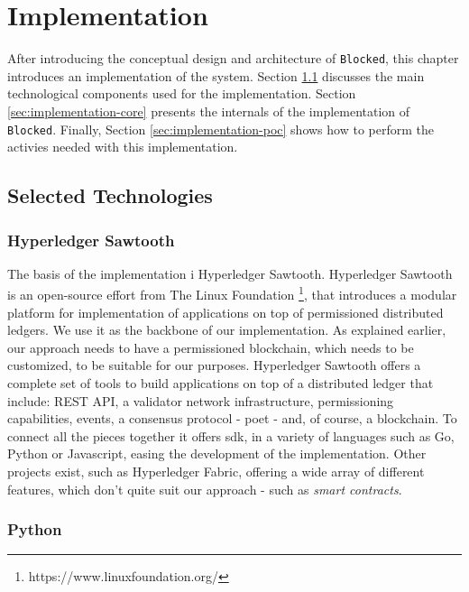 \chapter{Implementation}
\label{chap:implementation}

After introducing the conceptual design and architecture of \texttt{Blocked}, this chapter introduces an implementation of the system. Section \ref{sec:implementation-technology} discusses the main technological components used for the implementation. Section \ref{sec:implementation-core} presents the internals of the implementation of \texttt{Blocked}. Finally, Section \ref{sec:implementation-poc} shows how to perform the activies needed with this implementation.

\section{Selected Technologies}
\label{sec:implementation-technology}

\subsection{Hyperledger Sawtooth}

The basis of the implementation i Hyperledger Sawtooth. Hyperledger Sawtooth is an open-source effort from The Linux Foundation \footnote{https://www.linuxfoundation.org/}, that introduces a modular platform for implementation of applications on top of permissioned distributed ledgers. We use it as the backbone of our implementation. As explained earlier, our approach needs to have a permissioned blockchain, which needs to be customized, to be suitable for our purposes. Hyperledger Sawtooth offers a complete set of tools to build applications on top of a distributed ledger that include: REST API, a validator network infrastructure, permissioning capabilities, events, a consensus protocol - \gls{poet} \cite{intel_poet} - and, of course, a blockchain. To connect all the pieces together it offers \gls{sdk}, in a variety of languages such as Go, Python or Javascript, easing the development of the implementation. Other projects exist, such as Hyperledger Fabric, offering a wide array of different features, which don't quite suit our approach - such as \textit{smart contracts}.

\subsection{Python}

